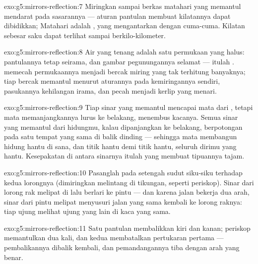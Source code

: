\begin{solution}{exo:g5:mirrors-reflection:7}
Miringkan  sampai berkas matahari yang memantul mendarat pada
sasarannya --- aturan pantulan membuat kilatannya dapat dibidikkan;
Matahari adalah , yang mengantarkan 
dengan cuma-cuma. Kilatan sebesar saku dapat terlihat sampai
berkilo-kilometer.
\end{solution}

\begin{solution}{exo:g5:mirrors-reflection:8}
Air yang tenang adalah satu permukaan yang halus: pantulannya tetap
seirama, dan gambar pegunungannya selamat --- itulah . 
memecah permukaannya menjadi bercak miring yang tak terhitung
banyaknya; tiap bercak memantul menurut aturannya pada kemiringannya
sendiri, pasukannya kehilangan irama, dan  pecah menjadi
kerlip yang menari.
\end{solution}

\begin{solution}{exo:g5:mirrors-reflection:9}
Tiap sinar yang memantul mencapai mata dari , tetapi mata
memanjangkannya lurus ke belakang, menembus kacanya. Semua sinar yang
memantul dari hidungmu, kalau dipanjangkan ke belakang, berpotongan
pada satu tempat yang sama di balik dinding --- sehingga mata
membangun hidung hantu di sana, dan titik hantu demi titik hantu,
seluruh dirimu yang hantu. Kesepakatan di antara sinarnya itulah yang
membuat tipuannya tajam.
\end{solution}

\begin{solution}{exo:g5:mirrors-reflection:10}
Pasanglah pada setengah sudut siku-siku terhadap kedua lorongnya
(dimiringkan melintang di tikungan, seperti  periskop). Sinar
dari lorong rak melipat di  lalu berlari ke pintu --- dan
karena jalan  bekerja dua arah, sinar dari pintu melipat
menyusuri jalan yang sama kembali ke lorong raknya: tiap ujung melihat
ujung yang lain di kaca yang sama.
\end{solution}

\begin{solution}{exo:g5:mirrors-reflection:11}
Satu pantulan membalikkan kiri dan kanan; periskop memantulkan
 dua kali, dan  kedua membatalkan pertukaran 
pertama --- pembalikannya dibalik kembali, dan pemandangannya tiba
dengan arah yang benar.
\end{solution}
